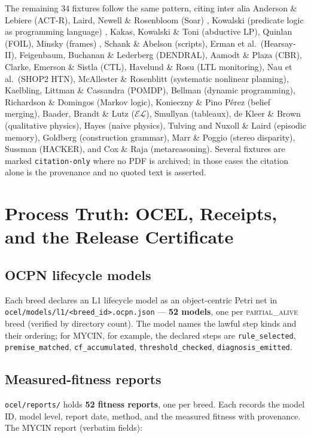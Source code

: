 \documentclass[11pt,oneside]{report}
\begin{document}
The remaining 34 fixtures follow the same pattern, citing inter alia
Anderson \& Lebiere (ACT-R), Laird, Newell \& Rosenbloom (Soar)
\cite{laird1987}, Kowalski (predicate logic as programming language)
\cite{kowalski1974}, Kakas, Kowalski \& Toni (abductive LP), Quinlan
(FOIL), Minsky (frames) \cite{minsky1974}, Schank \& Abelson (scripts),
Erman et al.\ (Hearsay-II), Feigenbaum, Buchanan \& Lederberg (DENDRAL),
Aamodt \& Plaza (CBR), Clarke, Emerson \& Sistla (CTL), Havelund \& Rosu
(LTL monitoring), Nau et al.\ (SHOP2 HTN), McAllester \& Rosenblitt
(systematic nonlinear planning), Kaelbling, Littman \& Cassandra (POMDP),
Bellman (dynamic programming), Richardson \& Domingos (Markov logic),
Konieczny \& Pino P\'erez (belief merging), Baader, Brandt \& Lutz
($\mathcal{EL}$), Smullyan (tableaux), de Kleer \& Brown (qualitative
physics), Hayes (naive physics), Tulving and Nuxoll \& Laird (episodic
memory), Goldberg (construction grammar), Marr \& Poggio (stereo
disparity), Sussman (HACKER), and Cox \& Raja (metareasoning). Several
fixtures are marked \texttt{citation-only} where no PDF is archived; in
those cases the citation alone is the provenance and no quoted text is
asserted.

\chapter{Process Truth: OCEL, Receipts, and the Release Certificate}
\label{ch:truth}

\section{OCPN lifecycle models}

Each breed declares an L1 lifecycle model as an object-centric Petri net
in \texttt{ocel/models/l1/<breed\_id>.ocpn.json} --- \textbf{52 models},
one per \textsc{partial\_alive} breed (verified by directory count). The
model names the lawful step kinds and their ordering; for MYCIN, for
example, the declared steps are \texttt{rule\_selected},
\texttt{premise\_matched}, \texttt{cf\_accumulated},
\texttt{threshold\_checked}, \texttt{diagnosis\_emitted}.

\section{Measured-fitness reports}

\texttt{ocel/reports/} holds \textbf{52 fitness reports}, one per breed.
Each records the model ID, model level, report date, method, and the
measured fitness with provenance. The MYCIN report (verbatim fields):
\end{document}
